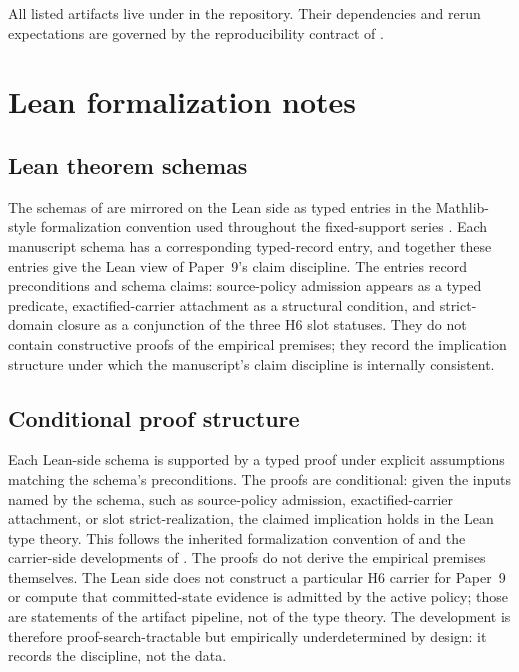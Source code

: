 \documentclass[11pt]{article}
\newcommand{\NewLayer}{H6}
\newcommand{\PaperNine}{Paper~9}
\theoremstyle{definition}
\begin{document}
All listed artifacts live under  in the repository.
Their dependencies and rerun expectations are governed by the reproducibility
contract of .
 \section{Lean formalization notes}\label{app:formalization}

\subsection{Lean theorem schemas}\label{subsec:lean-theorem-schemas}

The schemas of  are mirrored on the Lean side as
typed entries in the Mathlib-style formalization convention used throughout the
fixed-support series
\cite{Tsiokos2026FoundationsII,Tsiokos2026CarrierExactification,Tsiokos2026PromotionCriteria,Tsiokos2026CarrierToEvent}.
Each manuscript schema has a corresponding typed-record entry, and together
these entries give the Lean view of \PaperNine{}'s claim discipline.  The
entries record preconditions and schema claims: source-policy admission appears
as a typed predicate, exactified-carrier attachment as a structural condition,
and strict-domain closure as a conjunction of the three \NewLayer{} slot
statuses.  They do not contain constructive proofs of the empirical premises;
they record the implication structure under which the manuscript's claim
discipline is internally consistent.

\subsection{Conditional proof structure}\label{subsec:lean-proof-structure}

Each Lean-side schema is supported by a typed proof under explicit assumptions
matching the schema's preconditions.  The proofs are conditional: given the
inputs named by the schema, such as source-policy admission, exactified-carrier
attachment, or slot strict-realization, the claimed implication holds in the
Lean type theory.  This follows the inherited formalization convention of
\cite{Tsiokos2026FoundationsII} and the carrier-side developments of
\cite{Tsiokos2026CarrierExactification,Tsiokos2026PromotionCriteria}.  The
proofs do not derive the empirical premises themselves.  The Lean side does not
construct a particular \NewLayer{} carrier for \PaperNine{} or compute that
committed-state evidence is admitted by the active policy; those are statements
of the artifact pipeline, not of the type theory.  The development is therefore
proof-search-tractable but empirically underdetermined by design: it records the
discipline, not the data.
\end{document}
